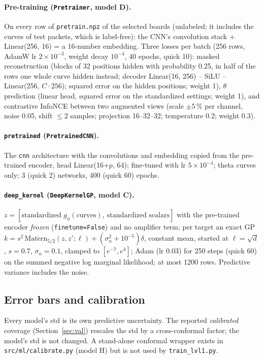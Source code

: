 \documentclass[10pt]{article}
\newcommand{\code}[1]{\texttt{#1}}
\begin{document}
\paragraph{Pre-training (\code{Pretrainer}, model D).} On every row of \code{pretrain.npz} of the selected boards
(unlabeled; it includes the curves of test packets, which is label-free): the CNN's convolution stack + Linear(256, 16)
= a 16-number embedding. Three losses per batch (256 rows, AdamW lr $2\times10^{-3}$, weight decay $10^{-4}$, 40 epochs,
quick 10): masked reconstruction (blocks of 32 positions hidden with probability 0.25, in half of the rows one whole
curve hidden instead; decoder Linear(16, 256) -- SiLU -- Linear(256, $C\cdot256$); squared error on the hidden
positions; weight 1), $\theta$ prediction (linear head, squared error on the standardized settings; weight 1), and
contrastive InfoNCE between two augmented views (scale $\pm5$\,\% per channel, noise 0.05, shift $\le 2$ samples;
projection 16--32--32; temperature 0.2; weight 0.3).

\paragraph{\code{pretrained} (\code{PretrainedCNN}).} The \code{cnn} architecture with the convolutions and embedding
copied from the pre-trained encoder, head Linear(16$+p$, 64); fine-tuned with lr $5\times10^{-4}$; theta curves only;
3 (quick 2) networks, 400 (quick 60) epochs.

\paragraph{\code{deep\_kernel} (\code{DeepKernelGP}, model C).} $z = [\text{standardized } g_\phi(\text{curves}),\
\text{standardized scalars}]$ with the pre-trained encoder \emph{frozen} (\code{finetune=False}) and no amplifier term;
per target an exact GP $k = s^2\,\mathrm{Mat\acute ern}_{5/2}(z, z'; \ell) + (\sigma_n^2 + 10^{-5})\delta$, constant mean,
started at $\ell = \sqrt d$, $s = 0.7$, $\sigma_n = 0.1$, clamped to $[e^{-7}, e^4]$; Adam (lr 0.03) for 250 steps
(quick 60) on the summed negative log marginal likelihood; at most 1200 rows. Predictive variance includes the noise.

\subsection{Error bars and calibration}

Every model's std is its own predictive uncertainty. The reported \emph{calibrated} coverage (Section~\ref{sec:val})
rescales the std by a cross-conformal factor; the model's std is not changed. A stand-alone conformal wrapper exists in
\code{src/ml/calibrate.py} (model H) but is not used by \code{train\_lvl1.py}.
\end{document}
